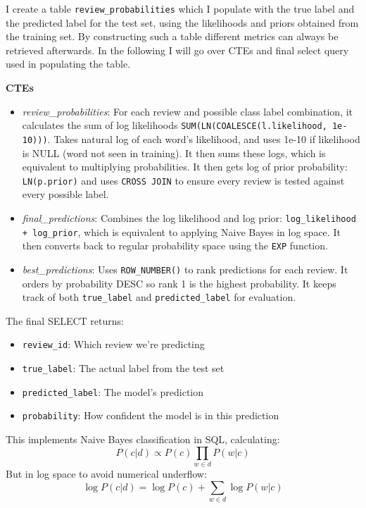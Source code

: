 \documentclass{article}
\begin{document}
\smallskip \noindent I create a table \texttt{review\_probabilities} which I populate with the true label and the predicted label for the test set, using the likelihoods and priors obtained from the training set. By constructing such a table different metrics can always be retrieved afterwards. In the following I will go over CTEs and final select query used in populating the table. 

\medskip \noindent \textbf{CTEs}
\begin{itemize}
    \item \textit{review\_probabilities}: For each review and possible class label combination, it calculates the sum of log likelihoods \texttt{SUM(LN(COALESCE(l.likelihood, 1e-10)))}. Takes natural log of each word's likelihood, and uses 1e-10 if likelihood is NULL (word not seen in training). It then sums these logs, which is equivalent to multiplying probabilities. It then gets log of prior probability: \texttt{LN(p.prior)} and uses \texttt{CROSS JOIN} to ensure every review is tested against every possible label.
    
    \item \textit{final\_predictions}: Combines the log likelihood and log prior: \texttt{log\_likelihood + log\_prior}, which is equivalent to applying Naive Bayes in log space. It then converts back to regular probability space using the \texttt{EXP} function. 
    
    \item \textit{best\_predictions}: Uses \texttt{ROW\_NUMBER()} to rank predictions for each review. It orders by probability DESC so rank 1 is the highest probability. It keeps track of both \texttt{true\_label} and \texttt{predicted\_label} for evaluation.
\end{itemize}

\medskip \noindent The final SELECT returns:
\begin{itemize}
    \item \texttt{review\_id}: Which review we're predicting
    \item \texttt{true\_label}: The actual label from the test set
    \item \texttt{predicted\_label}: The model's prediction
    \item \texttt{probability}: How confident the model is in this prediction
\end{itemize}

\noindent This implements Naive Bayes classification in SQL, calculating:
$$P(c|d) \propto P(c) \prod_{w \in d} P(w|c)$$
But in log space to avoid numerical underflow:
$$\log P(c|d) = \log P(c) + \sum_{w \in d} \log P(w|c)$$
\end{document}
